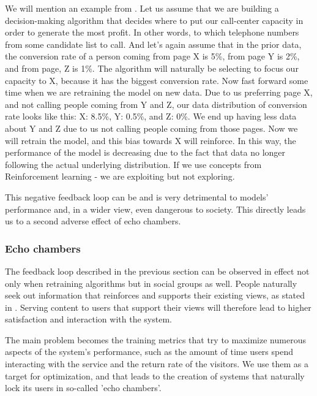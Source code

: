 We will mention an example from \cite{towardsdatascience_negative_feedback_loop}. Let us assume that we are building a decision-making algorithm that decides where to put our call-center capacity in order to generate the most profit. In other words, to which telephone numbers from some candidate list to call. And let's again assume that in the prior data, the conversion rate of a person coming from page X is 5\%, from page Y is 2\%, and from page, Z is 1\%. The algorithm will naturally be selecting to focus our capacity to X, because it has the biggest conversion rate. Now fast forward some time when we are retraining the model on new data. Due to us preferring page X, and not calling people coming from Y and Z, our data distribution of conversion rate looks like this: X: 8.5\%, Y: 0.5\%, and Z: 0\%. We end up having less data about Y and Z due to us not calling people coming from those pages. Now we will retrain the model, and this bias towards X will reinforce. In this way, the performance of the model is decreasing due to the fact that data no longer following the actual underlying distribution. If we use concepts from Reinforcement learning - we are exploiting but not exploring.

This negative feedback loop can be and is very detrimental to models' performance and, in a wider view, even dangerous to society. This directly leads us to a second adverse effect of echo chambers.

\subsubsection{Echo chambers}
The feedback loop described in the previous section can be observed in effect not only when retraining algorithms but in social groups as well. People naturally seek out information that reinforces and supports their existing views, as stated in \cite{garrett2009_reinforcing_opinion}. Serving content to users that support their views will therefore lead to higher satisfaction and interaction with the system.

The main problem becomes the training metrics that try to maximize numerous aspects of the system's performance, such as the amount of time users spend interacting with the service and the return rate of the visitors. We use them as a target for optimization, and that leads to the creation of systems that naturally lock its users in so-called 'echo chambers'.

